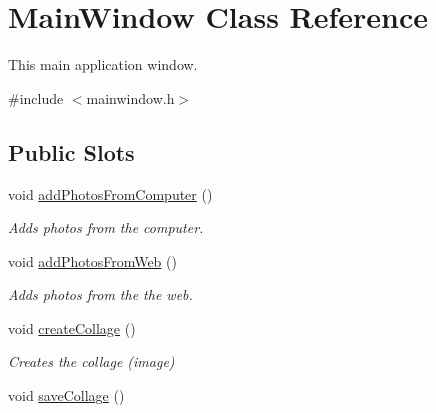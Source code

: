 \hypertarget{class_main_window}{
\section{MainWindow Class Reference}
\label{class_main_window}
}


This main application window.  




{\ttfamily \#include $<$mainwindow.h$>$}

\subsection*{Public Slots}
\begin{DoxyCompactItemize}
\item 
\hypertarget{class_main_window_a46e9f5caf527b2179e866b249cac0d73}{
void \hyperlink{class_main_window_a46e9f5caf527b2179e866b249cac0d73}{addPhotosFromComputer} ()}
\label{class_main_window_a46e9f5caf527b2179e866b249cac0d73}

\begin{DoxyCompactList}\small\item\em Adds photos from the computer. \item\end{DoxyCompactList}\item 
\hypertarget{class_main_window_a752391cdbe02f6e4cc27279ea5f52299}{
void \hyperlink{class_main_window_a752391cdbe02f6e4cc27279ea5f52299}{addPhotosFromWeb} ()}
\label{class_main_window_a752391cdbe02f6e4cc27279ea5f52299}

\begin{DoxyCompactList}\small\item\em Adds photos from the the web. \item\end{DoxyCompactList}\item 
\hypertarget{class_main_window_ae4c115ab42c4887ddc863976bb98d194}{
void \hyperlink{class_main_window_ae4c115ab42c4887ddc863976bb98d194}{createCollage} ()}
\label{class_main_window_ae4c115ab42c4887ddc863976bb98d194}

\begin{DoxyCompactList}\small\item\em Creates the collage (image) \item\end{DoxyCompactList}\item 
\hypertarget{class_main_window_a6e268e16dd1f4fa522fdfb72e915bdc7}{
void \hyperlink{class_main_window_a6e268e16dd1f4fa522fdfb72e915bdc7}{saveCollage} ()}
\label{class_main_window_a6e268e16dd1f4fa522fdfb72e915bdc7}


\end{DoxyCompactItemize}

